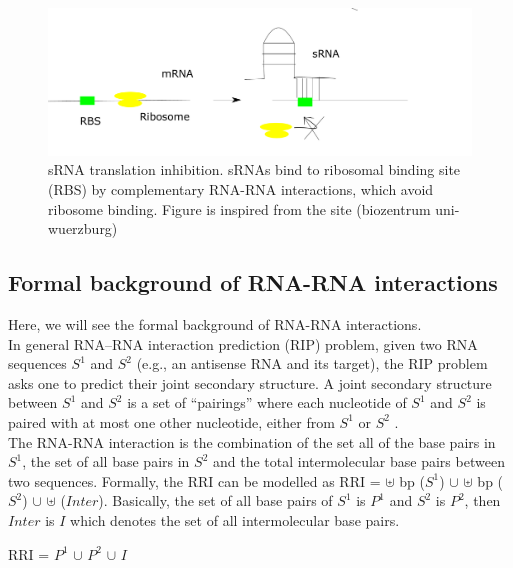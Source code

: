 \documentclass[twoside,a4paper]{report}
\numberwithin{equation}{section}
\begin{document}
 	
 	 \begin{figure}[tb]
 		\includegraphics[width=0.8\linewidth]{sRNA}
 		\centering
 		\caption{sRNA translation inhibition. sRNAs bind to ribosomal binding site (RBS) by complementary RNA-RNA interactions, which avoid ribosome binding. Figure is inspired from the site (biozentrum uni-wuerzburg)\\}
 		\label{fig:sRNA}
 	\end{figure}
 	
 	
 	\subsection{Formal background of RNA-RNA interactions}
 	Here, we will see the formal background of RNA-RNA interactions.\\
 	In general RNA–RNA interaction prediction (RIP) problem, given two RNA sequences $S^1$ and $S^2$ (e.g., an antisense RNA and its target), the RIP problem asks one to predict their joint secondary structure. A joint secondary structure between $S^1$ and $S^2$ is a set of “pairings” where each nucleotide of $S^1$ and $S^2$ is paired with at most one other nucleotide, either from $S^1$ or $S^2$ \citep{alkan2006rna}.  \\
 	
 	The RNA-RNA interaction is the combination of the set all of the base pairs in $S^1$, the set of all base pairs in $S^2$ and the total intermolecular base pairs between two sequences. Formally, the RRI can be modelled as RRI = $ \uplus $ bp ($S^1$) $ \cup $ $\uplus$ bp ($S^2$) $\cup$ $\uplus$ ($Inter$). Basically, the set of all base pairs of $S^1$ is $P^1$ and $S^2$ is $P^2$, then $Inter$ is $I$ which denotes the set of all intermolecular base pairs. \\
 	
 		\begin{center}
 		RRI =  $P^1$ $ \cup $  $P^2$ $\cup$ $I$
 		\end{center}
 	
\end{document}
